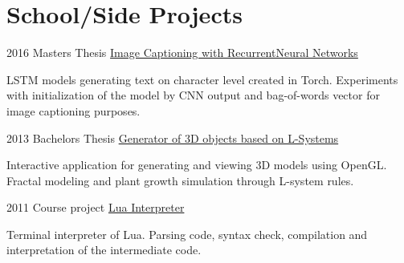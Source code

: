 \documentclass{tccv}
\begin{document}
\section{School/Side Projects}

\begin{eventlist}
	
	\item{2016}
	{Masters Thesis}
	{{\href{https://github.com/kvitajakub/MasterThesis}{Image Captioning with Recurrent\newline Neural Networks}}}
	
	LSTM models generating text on character level created in Torch. Experiments with initialization of the model by CNN output and bag-of-words vector for image captioning purposes. 
	
	\item{2013}
	{Bachelors Thesis}
	{{\href{https://github.com/kvitajakub/LSystemModeller}{Generator of 3D objects based on L-Systems}}}
	
	Interactive application for generating and viewing 3D models using OpenGL. Fractal modeling and plant growth simulation through L-system rules.
	
	\item{2011}
	{Course project}
	{{\href{https://github.com/kvitajakub/interpreterLua}{Lua Interpreter}}}
	
	Terminal interpreter of Lua. Parsing code, syntax check, compilation and interpretation of the intermediate code.
	
\end{eventlist}
\end{document}
